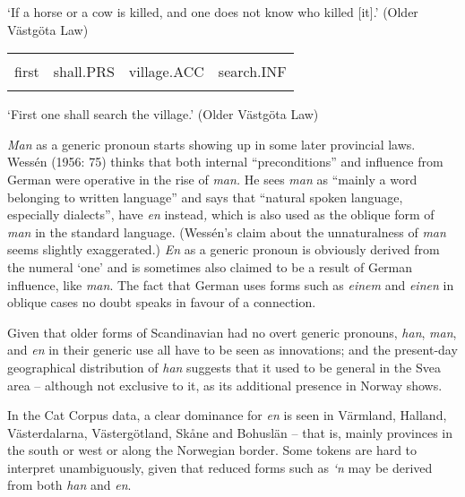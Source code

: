 \begin{styleTranslation}
‘If a horse or a cow is killed, and one does not know who killed [it].’ (Older Västgöta Law)

\end{styleTranslation}

\begin{tabular}{llll}
\lsptoprule
\multicolumn{4}{l}{Fyrst

}\\
first & shall.PRS & village.ACC & search.INF\\
\lspbottomrule
\end{tabular}

\begin{styleTranslation}
‘First one shall search the village.’ (Older Västgöta Law)

\end{styleTranslation}

\begin{styleBodyTextFirst}
\textit{Man} as a generic pronoun starts showing up in some later provincial laws. Wessén (1956: 75) thinks that both internal “preconditions” and influence from German were operative in the rise of \textit{man. }He sees \textit{man} as “mainly a word belonging to written language” and says that “natural spoken language, especially dialects”, have \textit{en }instead\textit{, }which is also used as the oblique form of \textit{man} in the standard language. (Wessén’s claim about the unnaturalness of \textit{man} seems slightly exaggerated.) \textit{En }as a generic pronoun\textit{ }is obviously derived from the numeral ‘one’ and is sometimes also claimed to be a result of German influence, like \textit{man}. The fact that German uses forms such as \textit{einem} and \textit{einen} in oblique cases no doubt speaks in favour of a connection.

\end{styleBodyTextFirst}

\begin{styleBodytextC}
Given that older forms of Scandinavian had no overt generic pronouns, \textit{han}, \textit{man}, and \textit{en} in their generic use all have to be seen as innovations; and the present-day geographical distribution of \textit{han} suggests that it used to be general in the Svea area – although not exclusive to it, as its additional presence in Norway shows. 

\end{styleBodytextC}

\begin{styleBodytextC}
In the Cat Corpus data, a clear dominance for \textit{en }is seen in Värmland, Halland, Västerdalarna, Västergötland, Skåne and Bohuslän – that is, mainly provinces in the south or west or along the Norwegian border. Some tokens are hard to interpret unambiguously, given that reduced forms such as \textit{‘n} may be derived from both \textit{han} and \textit{en}. 

\end{styleBodytextC}


